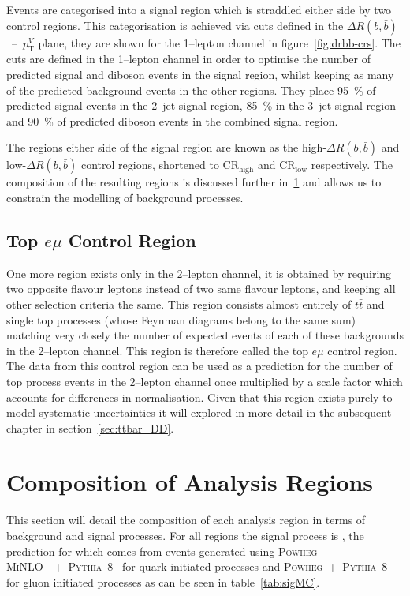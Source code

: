 Events are categorised into a signal region which is straddled either side by
two control regions. This categorisation is achieved via cuts defined in the
$\Delta R(b, \bar{b})$~--~$p_{\mathrm{T}}^{V}$ plane, they are shown for the
1--lepton channel in figure~\ref{fig:drbb-crs}. The cuts are defined in the
1--lepton channel in order to optimise the number of predicted signal and
diboson events in the signal region, whilst keeping as many of the predicted
background events in the other regions. They place 95~\% of predicted signal
events in the 2--jet signal region, 85~\% in the 3--jet signal region and 90~\%
of predicted diboson events in the combined signal region.

The regions either side of the signal region are known as the high-$\Delta R(b,
\bar{b})$ and low-$\Delta R(b, \bar{b})$ control regions, shortened to
CR$_{\text{high}}$ and CR$_{\text{low}}$ respectively. The composition of the
resulting regions is discussed further in~\ref{sec:composition} and allows us to
constrain the modelling of background processes.

\subsection{Top \texorpdfstring{$e \mu$}{e mu} Control Region}%
\label{sec:topemucr}

One more region exists only in the 2--lepton channel, it is obtained by
requiring two opposite flavour leptons instead of two same flavour leptons, and
keeping all other selection criteria the same. This region consists almost
entirely of $t\bar{t}$ and single top processes (whose Feynman diagrams belong
to the same sum) matching very closely the number of expected events of each of
these backgrounds in the 2--lepton channel. This region is therefore called the
top $e \mu$ control region. The data from this control region can be used as a
prediction for the number of top process events in the 2--lepton channel once
multiplied by a scale factor which accounts for differences in normalisation.
Given that this region exists purely to model systematic uncertainties it will
explored in more detail in the subsequent chapter in section~\ref{sec:ttbar_DD}.

\section{Composition of Analysis Regions}
\label{sec:composition}

This section will detail the composition of each analysis region in terms of
background and signal processes. For all regions the signal process is \VHbb,
the prediction for which comes from events generated using \textsc{Powheg
MiNLO}~\cite{Luisoni2013}~+~\textsc{Pythia~8}~\cite{pythia8} for quark initiated
processes and \textsc{Powheg}~+~\textsc{Pythia~8} for gluon initiated processes
as can be seen in table~\ref{tab:sigMC}. 


